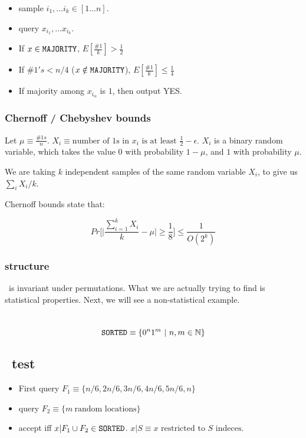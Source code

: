 \begin{itemize}
    \item sample $i_1, \dots i_k \in [1 \dots n]$.
    \item query $x_{i_1}, \dots x_{i_k}$.
    \item If $x \in \texttt{MAJORITY}$, $E[\frac{\#1}{k}] > \frac{1}{2}$
    \item If $\#1's < n/4$ ($x \notin \texttt{MAJORITY}$), $E[\frac{\#1}{k}] \leq \frac{1}{4}$
    \item If majority among $x_{i_\alpha}$ is $1$, then output YES.
\end{itemize}

\subsubsection{Chernoff / Chebyshev bounds}
Let $\mu \equiv \frac{\#1s}{n}$.
$X_i \equiv \text{number of 1s in $x_i$ is at least $\frac{1}{2} - \epsilon$}$.
$X_i$ is a binary random variable, which takes the value $0$ with probability $1 - \mu$,
and $1$ with probability $\mu$.

We are taking $k$ independent samples of the same random variable $X_i$, to
give us $\sum_i X_i / k$.

Chernoff bounds state that:

$$Pr\bigg[ \bigg| \frac{ \sum_{i=1}^k X_i}{k} - \mu \bigg| \geq \frac{1}{8} \bigg] \leq \frac{1}{O(2^k)}$$

\subsubsection{\majority structure}
\majority~is invariant under permutations. What we are actually trying to find
is statistical properties. Next, we will see a non-statistical example.


\section{\sorted}
$$\texttt{SORTED} \equiv \{ 0^n1^m~|~ n, m \in \mathbb{N} \}$$

\subsection{\sorted~test}
\begin{itemize}
    \item First query $F_1 \equiv \{ n/6, 2n/6, 3n/6, 4n/6, 5n/6, n \}$
    \item query $F_2 \equiv \{ m~\text{random locations} \}$
    \item accept iff  $x|F_1 \cup F_2 \in \texttt{SORTED}$. $x|S \equiv \text{$x$ restricted to $S$ indeces}$.
\end{itemize}

